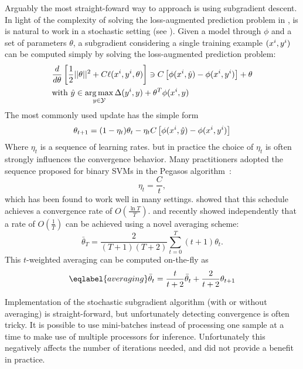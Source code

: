 Arguably the most straight-foward way to approach  is
using subgradient descent.  In light of the complexity of solving the
loss-augmented prediction problem in , is is natural
to work in a stochastic setting (see \citet{ratliff2007online}).
Given a model through $\phi$ and a set of parameters $\theta$, a subgradient
considering a single training example $(x^{i}, y^{i})$
can be computed simply by solving the loss-augmented prediction problem:
\begin{align}
    &\frac{d}{d\theta} \left [ \frac{1}{2} ||\theta||^2 + C \ell(x^{i}, y^{i}, \theta) \right ] \ni C\left [ \phi(x^{i}, \hat{y}) - \phi(x^{i}, y^{i}) \right]+ \theta\\
    &\text{with }\hat{y} \in \operatorname*{arg\,max}_{y \in \mathcal{Y}} \Delta(y^{i}, y) + \theta^T \phi(x^{i}, y)
\end{align}
The most commonly used update has the simple form
\begin{equation}
    \theta_{t+1} = (1 - \eta_t) \theta_t - \eta_t C \left [\phi(x^{i}, \hat{y}) - \phi(x^{i}, y^{i})\right]
\end{equation}
Where $\eta_t$ is a sequence of learning rates.
but in practice the choice of $\eta_t$ is often strongly influences the convergence behavior.
Many practitioners adopted the sequence proposed for binary SVMs in the Pegasos algorithm~\citep{shalev2011pegasos}:
\begin{equation}
    \eta_t = \frac{C}{t},
\end{equation}
which has been found to work well in many settings.
\citet{shalev2011pegasos} showed that this schedule achieves a convergence rate of $O(\frac{\ln T }{T})$.
\citet{lacoste2012block} and \citet{shamir2012stochastic} recently showed independently that
a rate of $O(\frac{1}{T})$ can be achieved using a novel averaging scheme:
\begin{equation}
    \bar{\theta}_{T} = \frac{2}{(T+1)(T+2)} \sum_{t=0}^T(t+1) \theta_t.
\end{equation}
This $t$-weighted averaging can be computed on-the-fly as
\begin{equation}\eqlabel{averaging}
    \bar{\theta}_{t} = \frac{t}{t + 2} \bar{\theta}_t + \frac{2}{t+2} \theta_{t+1}
\end{equation}

Implementation of the stochastic subgradient algorithm (with or without
averaging) is straight-forward, but unfortunately detecting convergence is
often tricky.
It is possible to use mini-batches instead of processing one sample at a time
to make use of multiple processors for inference. Unfortunately this negatively
affects the number of iterations needed, and did not provide a benefit in practice.

